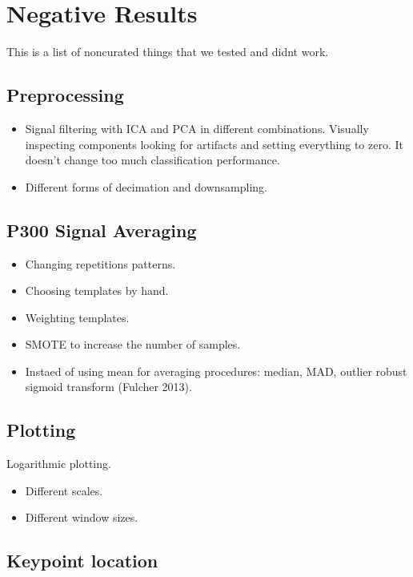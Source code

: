 \chapter{Negative Results}

This is a list of noncurated things that we tested and didnt work.

\section{Preprocessing}

\begin{itemize}
\item Signal filtering with ICA and PCA in different combinations. Visually inspecting components looking for artifacts and setting everything to zero.  It doesn't change too much classification performance.
\item Different forms of decimation and downsampling.
\end{itemize}

\section{P300 Signal Averaging}

\begin{itemize}
\item Changing repetitions patterns. 
\item Choosing templates by hand.
\item Weighting templates.
\item SMOTE to increase the number of samples.
\item Instaed of using mean for averaging procedures: median, MAD, outlier robust sigmoid transform (Fulcher 2013).
\end{itemize}

\section{Plotting}

Logarithmic plotting.
\begin{itemize}
\item Different scales.
\item Different window sizes.
\end{itemize}

\section{Keypoint location}

